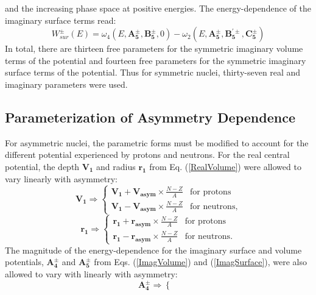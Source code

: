 \documentclass[twocolumn,secnumarabic,amssymb, nobibnotes, aps, prl,
superscriptaddress, nobalancelastpage, floatfix]{revtex4}
\begin{document}
{and the increasing phase space at positive energies.
The energy-dependence of the imaginary surface terms read:
\begin{equation} \label{ImagSurface}
    W_{sur}^{\pm}(E) = \omega_{4}(E, \mathbf{A_{5}^{\pm}}, \mathbf{B_{5}^{\pm}}, 0)
    - \omega_{2}(E, \mathbf{A_{5}^{\pm}}, \mathbf{B_{5}^{'\pm}}, \mathbf{C_{5}^{\pm}})
\end{equation}
In total, there are
thirteen free parameters for the symmetric imaginary volume terms of the
potential and fourteen free parameters for the symmetric imaginary surface terms
of the potential. Thus for symmetric nuclei, thirty-seven real and imaginary
parameters were used.

\subsection{Parameterization of Asymmetry Dependence}
For asymmetric nuclei,
the parametric forms must be modified to account for the different potential experienced by 
protons and neutrons. For the real central potential, the depth $\mathbf{V_{1}}$ and radius
$\mathbf{r_{1}}$ from Eq. (\ref{RealVolume}) were allowed to vary linearly with asymmetry:
\begin{equation} \label{HFDepthAsymmDependence}
    \mathbf{V_{1}} \Rightarrow \begin{cases}
        \mathbf{V_{1}} + \mathbf{V_{asym}}\times\frac{N-Z}{A} & \text{for protons}\\
        \mathbf{V_{1}} - \mathbf{V_{asym}}\times\frac{N-Z}{A} & \text{for neutrons},
    \end{cases}
\end{equation}
\begin{equation} \label{HFRadAsymmDependence}
    \mathbf{r_{1}} \Rightarrow \begin{cases}
        \mathbf{r_{1}} + \mathbf{r_{asym}}\times\frac{N-Z}{A} & \text{for protons}\\
        \mathbf{r_{1}} - \mathbf{r_{asym}}\times\frac{N-Z}{A} & \text{for neutrons}.
    \end{cases}
\end{equation}
The magnitude of the energy-dependence for the imaginary surface and volume potentials,
$\mathbf{A_{4}^{\pm}}$ and $\mathbf{A_{5}^{\pm}}$ from Eqs. (\ref{ImagVolume}) and
(\ref{ImagSurface}), were also allowed to vary with linearly with asymmetry:
\begin{equation} \label{ImVolAsymmDependence}
    \mathbf{A_{4}^{\pm}} \Rightarrow \begin{cases}

\end{cases}
\end{equation}}
\end{document}
